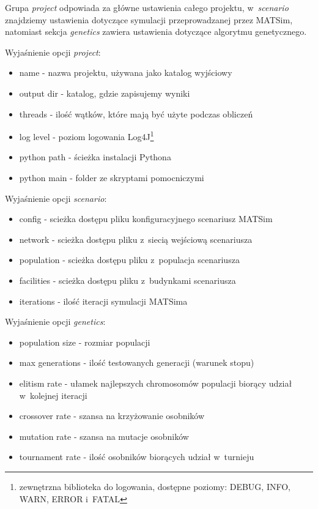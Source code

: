 \documentclass[twoside,12pt]{report}
\begin{document}
\vspace*{15px}

Grupa \textit{project} odpowiada za główne ustawienia całego projektu, w~\textit{scenario} znajdziemy ustawienia dotyczące symulacji przeprowadzanej przez MATSim, natomiast sekcja \textit{genetics} zawiera ustawienia dotyczące algorytmu genetycznego.

\vspace*{15px}

Wyjaśnienie opcji \textit{project}:
\begin{itemize}
\item name - nazwa projektu, używana jako katalog wyjściowy
\item output dir - katalog, gdzie zapisujemy wyniki
\item threads - ilość wątków, które mają być użyte podczas obliczeń
\item log level - poziom logowania Log4J\footnote{zewnętrzna biblioteka do logowania, dostępne poziomy: DEBUG, INFO, WARN, ERROR i~FATAL}
\item python path - ścieżka instalacji Pythona
\item python main - folder ze skryptami pomocniczymi
\end{itemize}

\vspace*{15px}

Wyjaśnienie opcji \textit{scenario}:
\begin{itemize}
\item config - scieżka dostępu pliku konfiguracyjnego scenariusz MATSim
\item network - scieżka dostępu pliku z~siecią wejściową scenariusza
\item population - scieżka dostępu pliku z~populacja scenariusza
\item facilities - scieżka dostępu pliku z~budynkami scenariusza
\item iterations - ilość iteracji symulacji MATSima
\end{itemize}

\vspace*{15px}

Wyjaśnienie opcji \textit{genetics}:
\begin{itemize}
\item population size - rozmiar populacji
\item max generations - ilość testowanych generacji (warunek stopu)
\item elitism rate - ułamek najlepszych chromosomów populacji biorący udział w~kolejnej iteracji
\item crossover rate - szansa na krzyżowanie osobników
\item mutation rate - szansa na mutacje osobników
\item tournament rate - ilość osobników biorących udział w~turnieju
\end{itemize}
\end{document}
